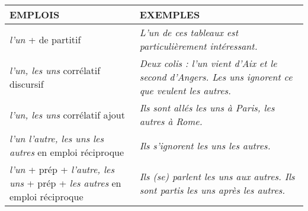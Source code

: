 \documentclass[UTF8]{report}
\begin{document}
\begin{table}[H]
\centering
\begin{tabular}{|>{\RaggedRight\arraybackslash}p{6cm}|>{\RaggedRight\arraybackslash}p{8cm}|} %
\hline
\rowcolor{cyan!20}
\textbf{EMPLOIS} & \textbf{EXEMPLES} \\
\hline
\textit{l'un} + de partitif & \textit{L'un de ces tableaux est particulièrement intéressant.} \\
\hline
\textit{l'un, les uns} corrélatif discursif & \textit{Deux colis : l'un vient d'Aix et le second d'Angers. Les uns ignorent ce que veulent les autres.} \\
\hline
\textit{l'un, les uns} corrélatif ajout & \textit{Ils sont allés les uns à Paris, les autres à Rome.} \\
\hline
\textit{l'un l'autre, les uns les autres} en emploi réciproque & \textit{Ils s'ignorent les uns les autres.} \\
\hline
\textit{l'un} + prép + \textit{l'autre, les uns} + prép + \textit{les autres} en emploi réciproque & \textit{Ils (se) parlent les uns aux autres. Ils sont partis les uns après les autres.} \\
\hline
\end{tabular}
\end{table}
\end{document}
